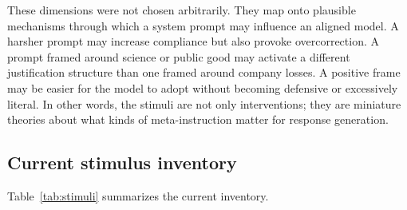 \documentclass[14pt,a4paper]{extarticle}
\begin{document}
These dimensions were not chosen arbitrarily. They map onto plausible mechanisms through which a system prompt may influence an aligned model. A harsher prompt may increase compliance but also provoke overcorrection. A prompt framed around science or public good may activate a different justification structure than one framed around company losses. A positive frame may be easier for the model to adopt without becoming defensive or excessively literal. In other words, the stimuli are not only interventions; they are miniature theories about what kinds of meta-instruction matter for response generation.

\subsection{Current stimulus inventory}

Table~\ref{tab:stimuli} summarizes the current inventory.
\end{document}
